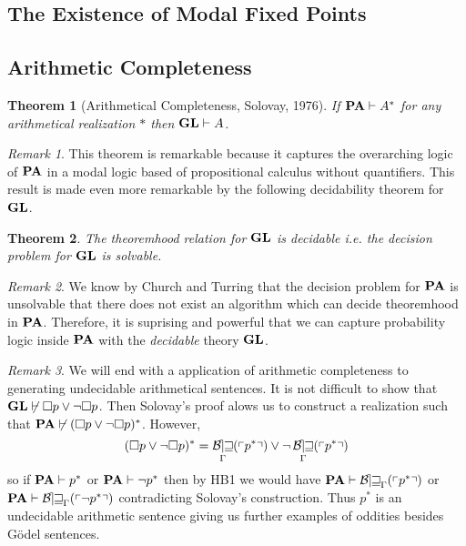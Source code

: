 \documentclass[12pt, leqno]{article}
\newcommand{\proves}{\vdash}
\theoremstyle{theorem}
\newtheorem{theorem}{Theorem}[section]
\theoremstyle{definition}
\theoremstyle{definition}
\theoremstyle{remark}
\theoremstyle{definition}
\theoremstyle{remark}
\newtheorem{remark}{Remark}[subsection]
\DeclareMathOperator{\Bew}{\mathcal{B\mkern-2.0mu e\mkern-2.0mu w\mkern-1mu}}
\newcommand{\Gterm}[1]{\left\ulcorner #1 \right\urcorner}
\newcommand{\Thm}[1]{\Bew_{\Gamma}(\Gterm{#1})}
\begin{document}
\subsection{The Existence of Modal Fixed Points}

\subsection{Arithmetic Completeness}

\begin{theorem}[Arithmetical Completeness, Solovay, 1976]
If $\PA \proves A^*$ for any arithmetical realization $*$ then $\GL \proves A$.
\end{theorem}


\begin{remark}
This theorem is remarkable because it captures the overarching logic of $\mathbf{PA}$ in a modal logic based of propositional calculus without quantifiers. This result is made even more remarkable by the following decidability theorem for $\mathbf{GL}$.
\end{remark}

\begin{theorem}
The theoremhood relation for $\mathbf{GL}$ is decidable i.e. the decision problem for $\mathbf{GL}$ is solvable. 
\end{theorem}

\begin{remark}
We know by Church and Turring that the decision problem for $\mathbf{PA}$ is unsolvable that there does not exist an algorithm which can decide theoremhood in $\mathbf{PA}$. Therefore, it is suprising and powerful that we can capture probability logic inside $\mathbf{PA}$ with the \textit{decidable} theory $\mathbf{GL}$.
\end{remark}

\begin{remark}
We will end with a application of arithmetic completeness to generating undecidable arithmetical sentences. It is not difficult to show that $\GL \not\proves \square p \vee \neg \square p$. Then Solovay's proof alows us to construct a realization such that $\PA \not\proves (\square p \vee \neg \square p)^*$. However,
\[ (\square p \vee \neg \square p)^* = \Thm{p^*} \vee \neg \Thm{p^*} \]
so if $\PA \proves p^*$ or $\PA \proves \neg p^*$ then by HB1 we would have $\PA \proves \Thm{p^*}$ or $\PA \proves \Thm{\neg p^*}$ contradicting Solovay's construction. Thus $p^*$ is an undecidable arithmetic sentence giving us further examples of oddities besides G\"{o}del sentences.
\end{remark}
\end{document}
